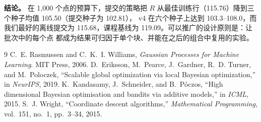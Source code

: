\documentclass[conference]{IEEEtran}
\begin{document}
\textbf{结论。} 在 1,000 个点的预算下，提交的策略把 $R$ 从最佳训练行（115.76）降到三个种子均值 105.50（提交种子为 102.81），
v4 在六个种子上达到 103.3--108.0，而我们最好的离线提交为 115.68，课程基线为 119.09。可以推广的设计原则是：让批次中的每个点
都成为结果可归因于单个块、并能在之后的组合中复用的实验。


\begin{thebibliography}{9}
 C.~E. Rasmussen and C.~K.~I. Williams, \emph{Gaussian Processes for Machine Learning}. MIT Press, 2006.
 D.~Eriksson, M.~Pearce, J.~Gardner, R.~D. Turner, and M.~Poloczek, ``Scalable global optimization via local Bayesian optimization,'' in \emph{NeurIPS}, 2019.
 K.~Kandasamy, J.~Schneider, and B.~P{\'o}czos, ``High dimensional Bayesian optimisation and bandits via additive models,'' in \emph{ICML}, 2015.
 S.~J. Wright, ``Coordinate descent algorithms,'' \emph{Mathematical Programming}, vol.~151, no.~1, pp.~3--34, 2015.
\end{thebibliography}
\end{document}
